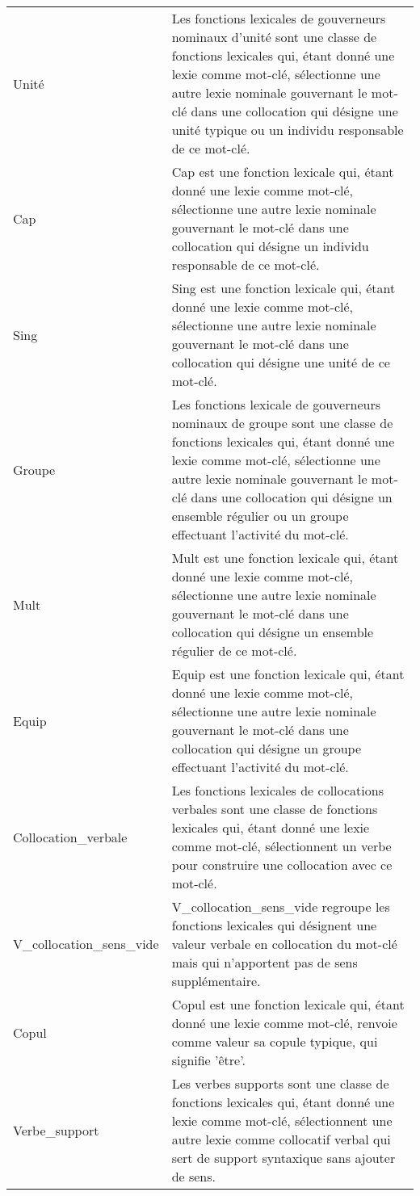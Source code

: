 \begin{longtable}{ll}
Unité & Les fonctions lexicales de gouverneurs nominaux d'unité sont une classe de fonctions lexicales qui, étant donné une lexie comme mot-clé, sélectionne une autre lexie nominale gouvernant le mot-clé dans une collocation qui désigne une unité typique ou un individu responsable de ce mot-clé. \\
Cap & Cap est une fonction lexicale qui, étant donné une lexie comme mot-clé, sélectionne une autre lexie nominale gouvernant le mot-clé dans une collocation qui désigne un individu responsable de ce mot-clé. \\
Sing & Sing est une fonction lexicale qui, étant donné une lexie comme mot-clé, sélectionne une autre lexie nominale gouvernant le mot-clé dans une collocation qui désigne une unité de ce mot-clé. \\
Groupe & Les fonctions lexicale de gouverneurs nominaux de groupe sont une classe de fonctions lexicales qui, étant donné une lexie comme mot-clé, sélectionne une autre lexie nominale gouvernant le mot-clé dans une collocation qui désigne un ensemble régulier ou un groupe effectuant l'activité du mot-clé. \\
Mult & Mult est une fonction lexicale qui, étant donné une lexie comme mot-clé, sélectionne une autre lexie nominale gouvernant le mot-clé dans une collocation qui désigne un ensemble régulier de ce mot-clé. \\
Equip & Equip est une fonction lexicale qui, étant donné une lexie comme mot-clé, sélectionne une autre lexie nominale gouvernant le mot-clé dans une collocation qui désigne un groupe effectuant l'activité du mot-clé. \\
Collocation\_verbale & Les fonctions lexicales de collocations verbales sont une classe de fonctions lexicales qui, étant donné une lexie comme mot-clé, sélectionnent un verbe pour construire une collocation avec ce mot-clé. \\
V\_collocation\_sens\_vide & V\_collocation\_sens\_vide regroupe les fonctions lexicales qui désignent une valeur verbale en collocation du mot-clé mais qui n'apportent pas de sens supplémentaire. \\
Copul & Copul est une fonction lexicale qui, étant donné une lexie comme mot-clé, renvoie comme valeur sa copule typique, qui signifie 'être'. \\
Verbe\_support & Les verbes supports sont une classe de fonctions lexicales qui, étant donné une lexie comme mot-clé, sélectionnent une autre lexie comme collocatif verbal qui sert de support syntaxique sans ajouter de sens. \\

\end{longtable}
